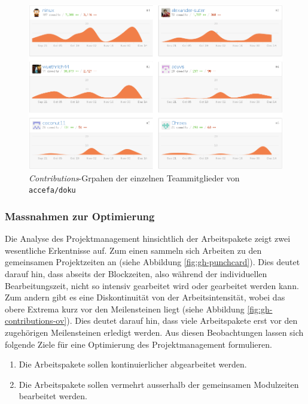 \begin{figure}[h!]
	\centering
	\includegraphics[width=1\textwidth]{../../fig/pm/gh-contributions-team.png}
	\caption{\emph{Contributions}-Grpahen der einzelnen Teammitglieder
		von \lstinline{accefa/doku}}
	\label{fig:gh-contributions-team}
\end{figure}

\subsubsection{Massnahmen zur Optimierung}\label{sec:issue-optize}
Die Analyse des Projektmanagement hinsichtlich der Arbeitspakete zeigt zwei
wesentliche Erkentnisse auf. Zum einen sammeln sich Arbeiten zu den
gemeinsamen Projektzeiten an (siehe Abbildung \ref{fig:gh-punchcard}).
Dies deutet darauf hin, dass abseits der Blockzeiten, also während der
individuellen Bearbeitungszeit, nicht so intensiv gearbeitet wird oder
gearbeitet werden kann. Zum andern gibt es eine Diskontinuität von der
Arbeitsintensität, wobei das obere Extrema kurz vor den Meilensteinen liegt
(siehe Abbildung \ref{fig:gh-contributions-ov}).
Dies deutet darauf hin, dass viele Arbeitspakete erst vor den zugehörigen
Meilensteinen erledigt werden. Aus diesen Beobachtungen lassen sich
folgende Ziele für eine Optimierung des Projektmanagement formulieren.

\begin{enumerate}
	\item Die Arbeitspakete sollen kontinuierlicher abgearbeitet werden.
	\item Die Arbeitspakete sollen vermehrt ausserhalb der gemeinsamen
		Modulzeiten bearbeitet werden.
\end{enumerate}


